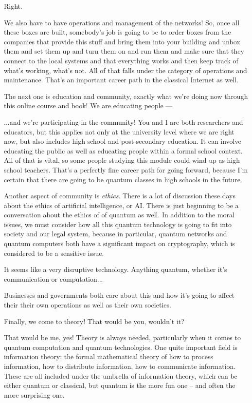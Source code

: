 \mmm Right.

\rrr We also have to have operations and management of the networks! So, once all these boxes are built, somebody's job is going to be to order boxes from the companies that provide this stuff and bring them into your building and unbox them and set them up and turn them on and run them and make sure that they connect to the local systems and that everything works and then keep track of what's working, what's not. All of that falls under the category of operations and maintenance. That's an important career path in the classical Internet as well.

\mmm The next one is education and community, exactly what we're doing now through this online course and book! We are educating people ---

\rrr ...and we're participating in the community! You and I are both researchers and educators, but this applies not only at the university level where we are right now, but also includes high school and post-secondary education. It can involve educating the public as well as educating people within a formal school context. All of that is vital, so some people studying this module could wind up as high school teachers. That's a perfectly fine career path for going forward, because I'm certain that there are going to be quantum classes in high schools in the future.

Another aspect of community is \emph{ethics}. There is a lot of discussion these days about the ethics of artificial intelligence, or AI. There is just beginning to be a conversation about the ethics of of quantum as well. In addition to the moral issues, we must consider how all this quantum technology is going to fit into society and our legal system, because in particular, quantum networks and quantum computers both have a significant impact on cryptography, which is considered to be a sensitive issue.

\mmm It seems like a very disruptive technology.  Anything quantum, whether it's communication or computation...

\rrr Businesses and governments both care about this and how it's going to affect their their own operations as well as their own societies.

Finally, we come to theory! That would be you, wouldn't it?

\mmm That would be me, yes! Theory is always needed, particularly when it comes to quantum computation and quantum technologies. One quite important field is information theory: the formal mathematical theory of how to process information, how to distribute information, how to communicate information. These are all included under the umbrella of information theory, which can be either quantum or classical, but quantum is the more fun one -- and often the more surprising one.

